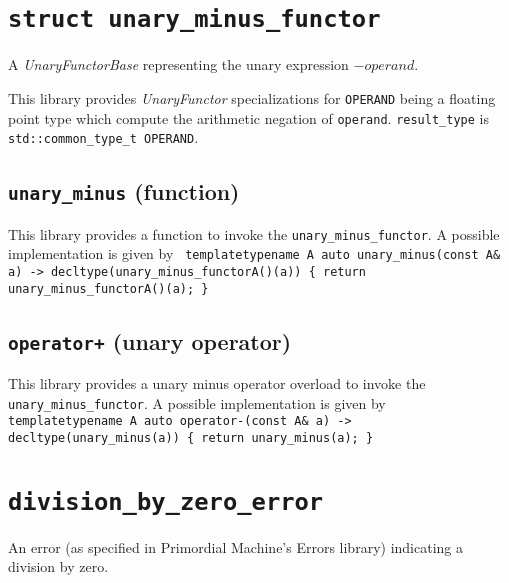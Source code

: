 \documentclass[oneside]{book}
\begin{document}
\section{\texttt{struct unary\_minus\_functor}}
A \textit{UnaryFunctorBase} representing the unary expression $-\textit{operand}$.\newline

\noindent{}This library provides \textit{UnaryFunctor}            specializations for
\texttt{OPERAND} being a floating point type which compute the arithmetic    negation
of \texttt{operand}. \texttt{result\_type} is \texttt{std::common\_type\_t\textlangle
OPERAND\textrangle}.

\subsection{\texttt{unary\_minus} (function)}
This library provides a function to invoke the \texttt{unary\_minus\_functor}.
A possible implementation is given by\newline
\texttt{
template\textlangle typename A\textrangle\newline
auto unary\_minus(const A\& a) -> decltype(unary\_minus\_functor\textlangle A\textrangle()(a))\newline
\{ return unary\_minus\_functor\textlangle A\textrangle()(a); \}
}

\subsection{\texttt{operator+} (unary operator)}
This library provides a unary minus operator overload to invoke the \texttt{unary\_minus\_functor}.
A possible implementation is given by\newline
\texttt{
template\textlangle typename A\textrangle\newline
auto operator-(const A\& a) -> decltype(unary\_minus(a))\newline
\{ return unary\_minus(a); \}
}

\section{\texttt{division\_by\_zero\_error}}
An error (as specified in Primordial Machine's Errors library) indicating a division by zero.
\end{document}
